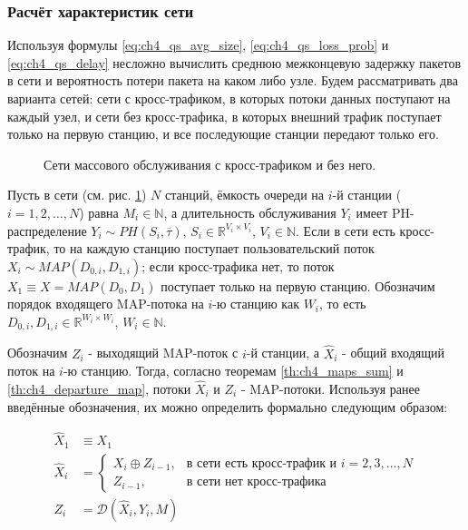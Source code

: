 \subsubsection{Расчёт характеристик сети}\label{sec:ch4_iterative_procedure}


Используя формулы \eqref{eq:ch4_qs_avg_size}, \eqref{eq:ch4_qs_loss_prob} и \eqref{eq:ch4_qs_delay} несложно вычислить среднюю межконцевую задержку пакетов в сети и вероятность потери пакета на каком либо узле. Будем рассматривать два варианта сетей: сети с кросс-трафиком, в которых потоки данных поступают на каждый узел, и сети без кросс-трафика, в которых внешний трафик поступает только на первую станцию, и все последующие станции передают только его.

\begin{figure}[htb]
  \caption{Сети массового обслуживания с кросс-трафиком и без него.}
  \label{fig:ch4_queueing_networks}
\end{figure}

Пусть в сети (см. рис. \ref{fig:ch4_queueing_networks}) $N$ станций, ёмкость очереди на $i$-й станции ($i = 1,2, \dots, N$) равна $M_i \in \mathbb{N}$, а длительность обслуживания $Y_i$ имеет PH-распределение $Y_i \sim PH(S_i, \overline{\tau})$, $S_i \in \mathbb{R}^{V_i \times V_i}$, $V_i \in \mathbb{N}$. Если в сети есть кросс-трафик, то на каждую станцию поступает пользовательский поток $X_i \sim MAP(D_{0,i}, D_{1,i})$; если кросс-трафика нет, то поток $X_1 \equiv X = MAP(D_0, D_1)$ поступает только на первую станцию. Обозначим порядок входящего MAP-потока на $i$-ю станцию как $W_i$, то есть $D_{0,i}, D_{1,i} \in \mathbb{R}^{W_i \times W_i}$, $W_i \in \mathbb{N}$.

Обозначим $Z_i$ - выходящий MAP-поток с $i$-й станции, а $\hat{X}_i$ - общий входящий поток на $i$-ю станцию. Тогда, согласно теоремам \ref{th:ch4_maps_sum} и \ref{th:ch4_departure_map}, потоки $\hat{X}_i$ и $Z_i$ - MAP-потоки. Используя ранее введённые обозначения, их можно определить формально следующим образом:

\begin{equation}
  \label{eq:ch4_total_arrival_and_departure}
  \begin{aligned}
    \hat{X}_1 &\equiv X_1\\
    \hat{X}_i &= \begin{cases}
      X_i \oplus Z_{i-1},&\text{в сети есть кросс-трафик и } i = 2,3, \dots, N\\
      Z_{i-1},&\text{в сети нет кросс-трафика}
    \end{cases}\\
    Z_i &= \mathcal{D}(\hat{X}_i, Y_i, M)
  \end{aligned}
\end{equation}


